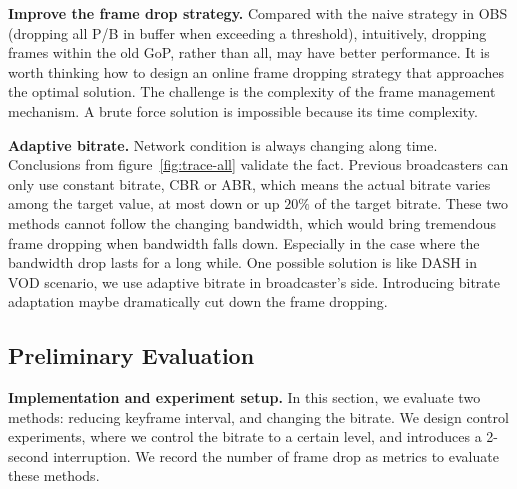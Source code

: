 \textbf{Improve the frame drop strategy.} Compared with the naive strategy in OBS (dropping all P/B in buffer when exceeding a threshold), intuitively, dropping frames within the old GoP, rather than all, may have better performance. It is worth thinking how to design an online frame dropping strategy that approaches the optimal solution. The challenge is the complexity of the frame management mechanism. A brute force solution is impossible because its time complexity.

\textbf{Adaptive bitrate.} Network condition is always changing along time. Conclusions from figure~\ref{fig:trace-all} validate the fact. Previous broadcasters can only use constant bitrate, CBR or ABR, which means the actual bitrate varies among the target value, at most down or up $20\%$ of the target bitrate. These two methods cannot follow the changing bandwidth, which would bring tremendous frame dropping when bandwidth falls down. Especially in the case where the bandwidth drop lasts for a long while. One possible solution is like DASH in VOD scenario, we use adaptive bitrate in broadcaster's side. Introducing bitrate adaptation maybe dramatically cut down the frame dropping.

\iffalse
\begin{itemize}
\item If we can relax the dependency between frames, the solution space would be larger and more optimal solutions are expected to be found. That is, we can relax the decodability constraints to be $d_i = 1, \forall i$.

\item We can relax queue length constraint, i.e., making $T_1$ larger. This change similarly increases the space of possible solutions.

\item The frame drop strategy can be improved. That is, compared with the naive strategy in OBS (dropping all P/B when exceeding a threshold), selectively choosing frames to drop in IP would give a more optimal solution.
\end{itemize}
\fi

\subsection{Preliminary Evaluation}
\textbf{Implementation and experiment setup.} In this section, we evaluate two methods: reducing keyframe interval, and changing the bitrate. We design control experiments, where we control the bitrate to a certain level, and introduces a 2-second interruption. We record the number of frame drop as metrics to evaluate these methods.

